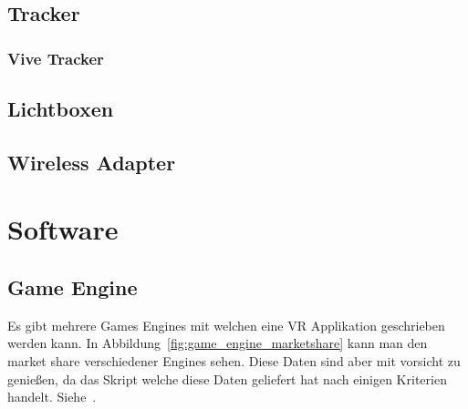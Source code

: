 \subsection{Tracker}\label{sec:tracker}

\subsubsection{Vive Tracker}\label{sec:vive-tracker}

\subsection{Lichtboxen}\label{sec:lighthouse}

\subsection{Wireless Adapter }

\section{Software}

\subsection{Game Engine}

Es gibt mehrere Games Engines mit welchen eine VR Applikation geschrieben werden kann.
In Abbildung~\ref{fig:game_engine_marketshare} kann man den market share verschiedener Engines sehen.
Diese Daten sind aber mit vorsicht zu genießen, da das Skript welche diese Daten geliefert hat nach einigen Kriterien handelt.
Siehe~\cite{REDDIT_2018}.

